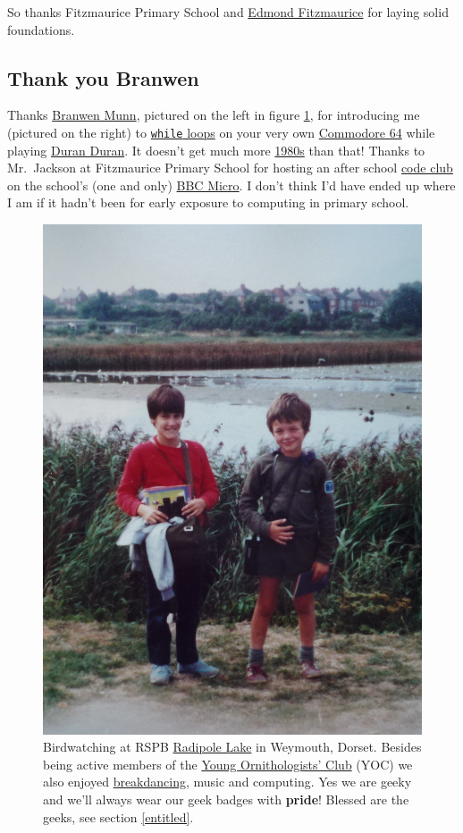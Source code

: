 \documentclass[
]{book}
\begin{document}
So thanks Fitzmaurice Primary School and \href{https://en.wikipedia.org/wiki/Edmond_Fitzmaurice,_1st_Baron_Fitzmaurice}{Edmond Fitzmaurice} for laying solid foundations. 🙏

\hypertarget{branwen}{%
\subsection{Thank you Branwen}\label{branwen}}

Thanks \href{https://www.branwen.online/}{Branwen Munn}, pictured on the left in figure \ref{fig:branwen-fig}, for introducing me (pictured on the right) to \href{https://en.wikipedia.org/wiki/While_loop}{\texttt{while} loops} on your very own \href{https://en.wikipedia.org/wiki/Commodore_64}{Commodore 64} while playing \href{https://en.wikipedia.org/wiki/Duran_Duran}{Duran Duran}. It doesn't get much more \href{https://en.wikipedia.org/wiki/1980s}{1980s} than that! Thanks to Mr.~Jackson at Fitzmaurice Primary School for hosting an after school \href{https://codeclub.org/}{code club} on the school's (one and only) \href{https://en.wikipedia.org/wiki/BBC_Micro}{BBC Micro}. I don't think I'd have ended up where I am if it hadn't been for early exposure to computing in primary school. \citep{computersgb}

\begin{figure}

{\centering \includegraphics[width=0.5\linewidth]{images/radipole-lake} 

}

\caption{Birdwatching at RSPB \href{https://en.wikipedia.org/wiki/Radipole_Lake}{Radipole Lake} in Weymouth, Dorset. Besides being active members of the \href{https://en.wikipedia.org/wiki/Young_Ornithologists\%27_Club}{Young Ornithologists' Club} (YOC) we also enjoyed \href{https://en.wikipedia.org/wiki/Breakdancing}{breakdancing}, music and computing. Yes we are geeky and we'll always wear our geek badges with \textbf{pride}! Blessed are the geeks, see section \ref{entitled}.}\label{fig:branwen-fig}
\end{figure}
\end{document}
